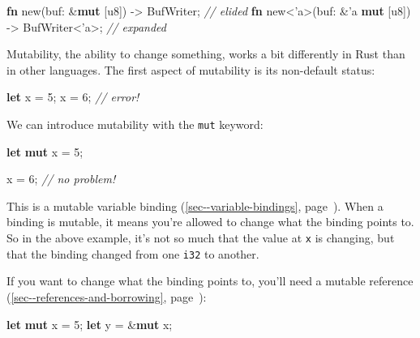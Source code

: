 \documentclass[a4paper,]{book}
\renewcommand*{\hyperref}[2][\ar]{%
  \def\ar{#2}%
  #2 (\autoref{#1}, page~\pageref{#1})}
\newenvironment{Shaded}{\begin{snugshade}}{\end{snugshade}}
\newcommand{\KeywordTok}[1]{\textcolor[rgb]{0.13,0.29,0.53}{\textbf{{#1}}}}
\newcommand{\DataTypeTok}[1]{\textcolor[rgb]{0.13,0.29,0.53}{{#1}}}
\newcommand{\DecValTok}[1]{\textcolor[rgb]{0.00,0.00,0.81}{{#1}}}
\newcommand{\CommentTok}[1]{\textcolor[rgb]{0.56,0.35,0.01}{\textit{{#1}}}}
\newcommand{\OtherTok}[1]{\textcolor[rgb]{0.56,0.35,0.01}{{#1}}}
\newcommand{\NormalTok}[1]{{#1}}
\begin{document}
\begin{Shaded}
\begin{Highlighting}[]
\KeywordTok{fn} \NormalTok{new(buf: &}\KeywordTok{mut} \NormalTok{[}\DataTypeTok{u8}\NormalTok{]) -> BufWriter; }\CommentTok{// elided}
\KeywordTok{fn} \NormalTok{new<}\OtherTok{'a}\NormalTok{>(buf: &}\OtherTok{'a} \KeywordTok{mut} \NormalTok{[}\DataTypeTok{u8}\NormalTok{]) -> BufWriter<}\OtherTok{'a}\NormalTok{>; }\CommentTok{// expanded}
\end{Highlighting}
\end{Shaded}


Mutability, the ability to change something, works a bit differently in
Rust than in other languages. The first aspect of mutability is its
non-default status:

\begin{Shaded}
\begin{Highlighting}[]
\KeywordTok{let} \NormalTok{x = }\DecValTok{5}\NormalTok{;}
\NormalTok{x = }\DecValTok{6}\NormalTok{; }\CommentTok{// error!}
\end{Highlighting}
\end{Shaded}

We can introduce mutability with the \texttt{mut} keyword:

\begin{Shaded}
\begin{Highlighting}[]
\KeywordTok{let} \KeywordTok{mut} \NormalTok{x = }\DecValTok{5}\NormalTok{;}

\NormalTok{x = }\DecValTok{6}\NormalTok{; }\CommentTok{// no problem!}
\end{Highlighting}
\end{Shaded}

This is a mutable \hyperref[sec--variable-bindings]{variable binding}.
When a binding is mutable, it means you're allowed to change what the
binding points to. So in the above example, it's not so much that the
value at \texttt{x} is changing, but that the binding changed from one
\texttt{i32} to another.

If you want to change what the binding points to, you'll need a
\hyperref[sec--references-and-borrowing]{mutable reference}:

\begin{Shaded}
\begin{Highlighting}[]
\KeywordTok{let} \KeywordTok{mut} \NormalTok{x = }\DecValTok{5}\NormalTok{;}
\KeywordTok{let} \NormalTok{y = &}\KeywordTok{mut} \NormalTok{x;}
\end{Highlighting}
\end{Shaded}
\end{document}

